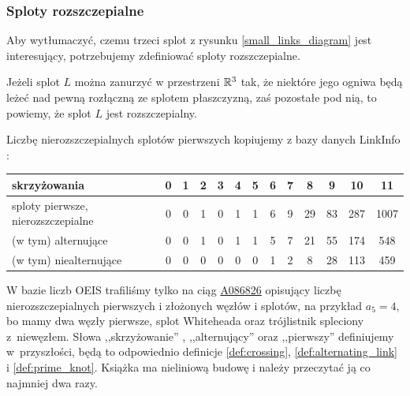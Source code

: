 \subsubsection{Sploty rozszczepialne}
Aby wytłumaczyć, czemu trzeci splot z rysunku \ref{small_links_diagram} jest interesujący, potrzebujemy zdefiniować sploty rozszczepialne.

\begin{definition}[rozszczepialność]
%
    Jeżeli splot $L$ można zanurzyć w przestrzeni $\mathbb R^3$ tak, że niektóre jego ogniwa będą leżeć nad pewną rozłączną ze splotem płaszczyzną, zaś pozostałe pod nią, to powiemy, że splot $L$ jest rozszczepialny.
\end{definition}

Liczbę nierozszczepialnych splotów pierwszych kopiujemy z bazy danych LinkInfo \cite{linkinfo24}:
\renewcommand*{\arraystretch}{1.4}
\footnotesize
\begin{longtable}{lcccccccccccc}
    \hline
    \textbf{skrzyżowania} & 0 & 1 & 2 & 3 & 4 & 5 &  6 &  7 &  8 & 9 & 10 & 11 \\ \hline \endhead
    sploty pierwsze, nierozszczepialne & 0 & 0 & 1 & 0 & 1 & 1 & 6 & 9 & 29 & 83 & 287 & 1007 \\
    (w tym) alternujące & 0 & 0 & 1 & 0 & 1 & 1 & 5 & 7 & 21 & 55 & 174 & 548 \\
    (w tym) niealternujące & 0 & 0 & 0 & 0 & 0 & 0 & 1 & 2 & 8 & 28 & 113 & 459 \\
    \hline
\end{longtable}
\normalsize

W bazie liczb OEIS trafiliśmy tylko na ciąg \href{https://oeis.org/A086826}{A086826} opisujący liczbę nierozszczepialnych pierwszych i złożonych węzłów i splotów, na przykład $a_5 = 4$, bo mamy dwa węzły pierwsze, splot Whiteheada oraz trójlistnik spleciony z~niewęzłem.
Słowa ,,skrzyżowanie'' , ,,alternujący'' oraz ,,pierwszy'' definiujemy w~przyszłości, będą to odpowiednio definicje \ref{def:crossing}, \ref{def:alternating_link} i \ref{def:prime_knot}.
%
%
%
Książka ma nieliniową budowę i należy przeczytać ją co najmniej dwa razy.

